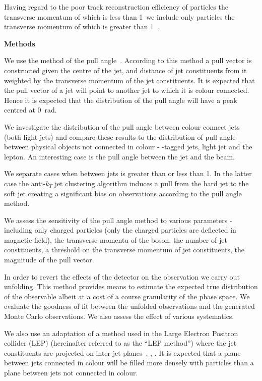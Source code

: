 Having regard to the poor track reconstruction efficiency of particles the transverse momentum of which is less than 1~\GeV we include only particles the transverse momentum of which is greater than 1~\GeV.
 
\medskip
\textbf{Methods}
\nopagebreak\medskip

We use the method of the pull angle~\cite{Gallicchio:2010sw}. According to this method a pull vector is constructed given the centre of the jet, and distance of jet constituents from it weighted by the transverse momentum \pt of the jet constituents. It is expected that the pull vector of a jet will point to another jet to which it is colour connected. Hence it is expected that the distribution of the pull angle will have a peak centred at 0~rad.

We investigate the distribution of the pull angle between colour connect jets (both light jets) and compare these results to the distribution of pull angle between physical objects not connected in colour - \cPqb-tagged jets, light jet and the lepton. An interesting case is the pull angle between the jet and the beam.

We separate cases when \DeltaR between jets is greater than or less than 1. In the latter case the anti-$k_{T}$ jet clustering algorithm induces a pull from the hard jet to the soft jet creating a significant bias on observations according to the pull angle method.

We assess the sensitivity of the pull angle method to various parameters - including only charged particles (only the charged particles are deflected in magnetic field), the transverse momentu of the \PW boson, the number of jet constituents, a threshold on the transverse momentum of jet constituents, the magnitude of the pull vector.

In order to revert the effects of the detector on the observation we carry out unfolding. This method provides means to estimate the expected true distribution of the observable albeit at a cost of a course granularity of the phase space. We evaluate the goodness of fit between the unfolded observations and the generated Monte Carlo observations. We also assess the effect of various systematics.  

We also use an adaptation of a method used in the Large Electron Positron collider (LEP) (hereinafter referred to as the ``LEP method'') where the jet constituents are projected on inter-jet planes~\cite{Abbiendi:2005es}, \cite{Abdallah:2006uq}, \cite{Achard:2003pe}. It is expected that a plane between jets connected in colour will be filled more densely with particles than a plane between jets not connected in colour.   


